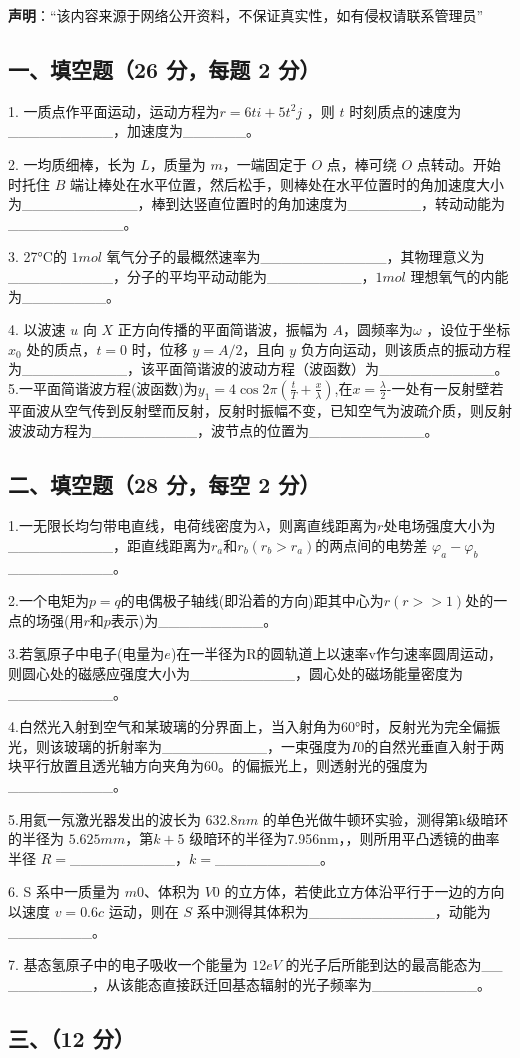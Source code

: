 
\textbf{声明}：“该内容来源于网络公开资料，不保证真实性，如有侵权请联系管理员”

\subsection{一、填空题（26 分，每题 2 分）}
1. 一质点作平面运动，运动方程为$r=6ti+5t^2j$ ，则 $t$ 时刻质点的速度为__________，加速度为______。

2. 一均质细棒，长为 $L$，质量为 $m$，一端固定于 $O$ 点，棒可绕 $O$ 点转动。开始时托住 $B$ 端让棒处在水平位置，然后松手，则棒处在水平位置时的角加速度大小为___________，棒到达竖直位置时的角加速度为_______，转动动能为___________。

3. 27°C的 $1mol$ 氧气分子的最概然速率为____________，其物理意义为__________，分子的平均平动动能为_________，$1mol$ 理想氧气的内能为________。

4. 以波速 $u$ 向 $X$ 正方向传播的平面简谐波，振幅为 $A$，圆频率为$\omega$ ，设位于坐标 $x_0$ 处的质点，$t=0$ 时，位移 $y=A/2$，且向 $y$ 负方向运动，则该质点的振动方程为__________，该平面简谐波的波动方程（波函数）为___________。
5.一平面简谐波方程(波函数)为$y_1=4\cos2\pi(\frac{t}{T}+\frac{x}{\lambda})$,在$x=\frac{\lambda}{2}$-一处有一反射壁若平面波从空气传到反射壁而反射，反射时振幅不变，已知空气为波疏介质，则反射波波动方程为__________，波节点的位置为___________。
\subsection{二、填空题（28 分，每空 2 分）}
1.一无限长均匀带电直线，电荷线密度为$\lambda$，则离直线距离为$r$处电场强度大小为__________，距直线距离为$r_a$和$r_b(r_b>r_a)$的两点间的电势差 $\varphi_a-\varphi_b$__________。

2.一个电矩为$p=q$的电偶极子轴线(即沿着的方向)距其中心为$r(r>>1)$处的一点的场强(用$r$和$p$表示)为__________。

3.若氢原子中电子(电量为$e$)在一半径为R的圆轨道上以速率v作匀速率圆周运动，则圆心处的磁感应强度大小为__________，圆心处的磁场能量密度为__________。

4.白然光入射到空气和某玻璃的分界面上，当入射角为60°时，反射光为完全偏振光，则该玻璃的折射率为__________，一束强度为$I0$的自然光垂直入射于两块平行放置且透光轴方向夹角为60。的偏振光上，则透射光的强度为__________。

5.用氦一氖激光器发出的波长为 $632.8nm$ 的单色光做牛顿环实验，测得第k级暗环的半径为 $5.625mm$，第$k+5$ 级暗环的半径为7.956nm，，则所用平凸透镜的曲率半径 $R=$__________，$k=$__________。

6. S 系中一质量为 $m0$、体积为 $V0$ 的立方体，若使此立方体沿平行于一边的方向以速度 $v=0.6c$ 运动，则在 $S$ 系中测得其体积为____________，动能为________。

7. 基态氢原子中的电子吸收一个能量为 $12eV$ 的光子后所能到达的最高能态为__
________，从该能态直接跃迁回基态辐射的光子频率为__________。

\subsection{三、（12 分）}